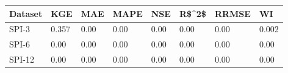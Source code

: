 \begin{tabular}{llllllll}
\toprule
Dataset &   KGE &  MAE & MAPE &  NSE & R\$\textasciicircum 2\$ & RRMSE &    WI \\
\midrule
  SPI-3 & 0.357 & 0.00 & 0.00 & 0.00 &  0.00 &  0.00 & 0.002 \\
  SPI-6 &  0.00 & 0.00 & 0.00 & 0.00 &  0.00 &  0.00 &  0.00 \\
 SPI-12 &  0.00 & 0.00 & 0.00 & 0.00 &  0.00 &  0.00 &  0.00 \\
\bottomrule
\end{tabular}
